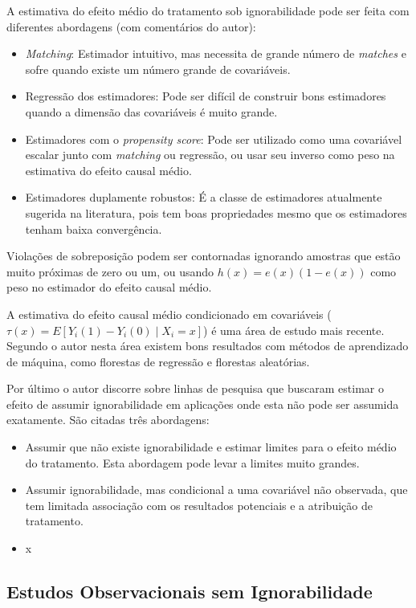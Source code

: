 \documentclass[final,5p]{elsarticle}
\numberwithin{equation}{section}
\begin{document}
    A estimativa do efeito médio do tratamento sob ignorabilidade pode ser feita com diferentes abordagens (com comentários do autor):
    \begin{itemize}
        \item \textit{Matching}: Estimador intuitivo, mas necessita de grande número de \textit{matches} e sofre quando existe um número grande de covariáveis.
        \item Regressão dos estimadores: Pode ser difícil de construir bons estimadores quando a dimensão das covariáveis é muito grande.
        \item Estimadores com o \textit{propensity score}: Pode ser utilizado como uma covariável escalar junto com \textit{matching} ou regressão, ou usar seu inverso como peso na estimativa do efeito causal médio.
        \item Estimadores duplamente robustos: É a classe de estimadores atualmente sugerida na literatura, pois tem boas propriedades mesmo que os estimadores tenham baixa convergência.
    \end{itemize}

    Violações de sobreposição podem ser contornadas ignorando amostras que estão muito próximas de zero ou um, ou usando $h(x) = e(x)(1-e(x))$ como peso no estimador do efeito causal médio.

    A estimativa do efeito causal médio condicionado em covariáveis ($\tau(x) = E[Y_i(1)-Y_i(0) \mid X_i=x]$) é uma área de estudo mais recente. Segundo o autor nesta área existem bons resultados com métodos de aprendizado de máquina, como florestas de regressão e florestas aleatórias.

    Por último o autor discorre sobre linhas de pesquisa que buscaram estimar o efeito de assumir ignorabilidade em aplicações onde esta não pode ser assumida exatamente. São citadas três abordagens:

    \begin{itemize}
        \item Assumir que não existe ignorabilidade e estimar limites para o efeito médio do tratamento. Esta abordagem pode levar a limites muito grandes.
        \item Assumir ignorabilidade, mas condicional a uma covariável não observada, que tem limitada associação com os resultados potenciais e a atribuição de tratamento.
        \item x
    \end{itemize}

    \subsection{Estudos Observacionais sem Ignorabilidade}
\end{document}
